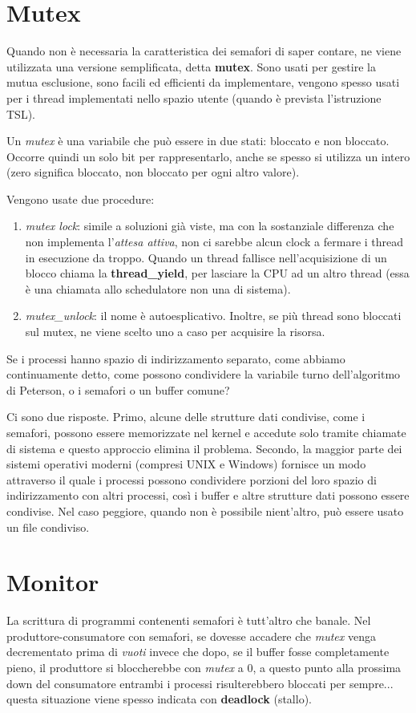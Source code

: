 \section{Mutex}
Quando non è necessaria la caratteristica dei semafori di saper contare, ne viene utilizzata una versione semplificata, detta \textbf{mutex}. Sono usati per gestire la mutua esclusione, sono facili ed efficienti da implementare, vengono spesso usati per i thread implementati nello spazio utente (quando è prevista l'istruzione TSL).

Un \textit{mutex} è una variabile che può essere in due stati: bloccato e non bloccato. Occorre quindi un solo bit per rappresentarlo, anche se spesso si utilizza un intero (zero significa bloccato, non bloccato per ogni altro valore).

Vengono usate due procedure: 
\begin{enumerate}
    \item \textit{mutex lock}: simile a soluzioni già viste, ma con la sostanziale differenza che non implementa l'\textit{attesa attiva}, non ci sarebbe alcun clock a fermare i thread in esecuzione da troppo. Quando un thread fallisce nell'acquisizione di un blocco chiama la \textbf{thread\_yield}, per lasciare la CPU ad un altro thread (essa è una chiamata allo schedulatore non una di sistema).
    \item \textit{mutex\_unlock}: il nome è autoesplicativo. Inoltre, se più thread sono bloccati sul mutex, ne viene scelto uno a caso per acquisire la risorsa.
\end{enumerate}

Se i processi hanno spazio di indirizzamento separato, come abbiamo continuamente detto, come possono condividere la variabile turno dell'algoritmo di Peterson, o i semafori o un buffer comune? 

Ci sono due risposte. Primo, alcune delle strutture dati condivise, come i semafori, possono essere memorizzate nel kernel e accedute solo tramite chiamate di sistema e questo approccio elimina il problema. Secondo, la maggior parte dei sistemi operativi moderni (compresi UNIX e Windows) fornisce un modo attraverso il quale i processi possono condividere porzioni del loro spazio di indirizzamento con altri processi, così i buffer e altre strutture dati possono essere condivise. Nel caso peggiore, quando non è possibile nient'altro, può essere usato un file condiviso.




\section{Monitor}
La scrittura di programmi contenenti semafori è tutt'altro che banale.
Nel produttore-consumatore con semafori, se dovesse accadere che \textit{mutex} venga decrementato prima di \textit{vuoti} invece che dopo, se il buffer fosse completamente pieno, il produttore si bloccherebbe con \textit{mutex} a 0, a questo punto alla prossima down del consumatore entrambi i processi risulterebbero bloccati per sempre... questa situazione viene spesso indicata con \textbf{deadlock} (stallo).

